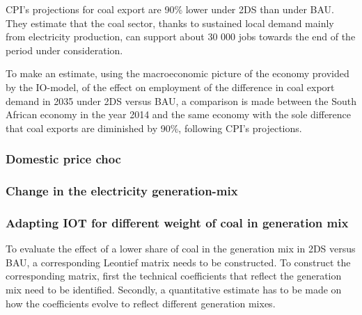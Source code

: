 \documentclass[12pt,english]{article}
\begin{document}
CPI's projections for coal export are 90\% lower under 2DS than under BAU. They estimate that the coal sector, thanks to sustained local demand mainly from electricity production, can support about 30 000 jobs towards the end of the period under consideration.

To make an estimate, using the macroeconomic picture of the economy provided by the IO-model, of the effect on employment of the difference in coal export demand in 2035 under 2DS versus BAU, a comparison is made between the South African economy in the year 2014 and the same economy with the sole difference that coal exports are diminished by 90\%, following CPI's projections. %








\citep{LandTransp2014}

\citep{P7000_2013}


\subsubsection{Domestic price choc}


\subsubsection{Change in the electricity generation-mix}


\subsubsection{Adapting IOT for different weight of coal in generation mix}
To evaluate the effect of a lower share of coal in the generation mix in 2DS versus BAU, a corresponding Leontief matrix needs to be constructed. To construct the corresponding matrix, first the technical coefficients that reflect the generation mix need to be identified. Secondly, a quantitative estimate has to be made on how the coefficients evolve to reflect different generation mixes.
\end{document}
